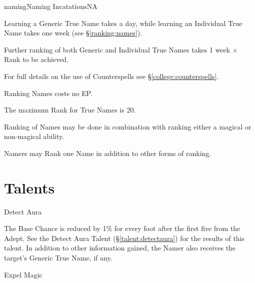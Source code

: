 \begin{College}[2.0]{naming}{Naming Incatations}{NA}
\begin{Itemize}
\item Learning a Generic True Name takes a day, while learning an
  Individual True Name takes one week (see \S\ref{ranking:names}).

\item Further ranking of both Generic and Individual True Names takes
  1 week × Rank to be achieved.
\end{Itemize}

For full details on the use of Counterspells see \S\ref{college:counterspells}.

\begin{Itemize}
\item Ranking Names costs no EP.  
\item The maximum Rank for True Names is 20.  
\item Ranking of Names may be done in combination with ranking either
  a magical or non-magical ability.
\item Namers may Rank one Name in addition to other forms of ranking.
\end{Itemize}


\section{Talents}
\label{naming:talents}
\begin{talent}[T-1]{Detect Aura}

\begin{effects}
The Base Chance is reduced by 1\% for every foot after the first five
from the Adept.  See the Detect Aura Talent
(\S\ref{talent:detectaura}) for the results of this talent.  In
addition to other information gained, the Namer also receives the
target’s Generic True Name, if any.
\end{effects}
\end{talent}

\begin{talent}[T-2]{Expel Magic}


\end{talent}
\end{College}
